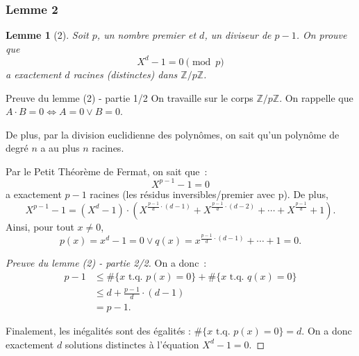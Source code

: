 \documentclass[10pt, mathserif]{beamer}
\newcommand{\tq}{\text{ t.q. }}
\newcommand{\Z}{\mathbb Z}
\newtheorem{lem}[thm]{Lemme}
\theoremstyle{definition}
\theoremstyle{remark}
\begin{document}
	\begin{frame}
		\frametitle{Lemme 2}
		\begin{lem}[2]
			Soit $p$, un nombre premier et $d$, un diviseur de $p-1$. On prouve que
			\[X^d - 1 = 0 \pmod p\]
			a exactement $d$ racines (distinctes) dans $\Z/p\Z$.
		\end{lem}
	\end{frame}

	\begin{frame}
		\begin{block}{Preuve du lemme (2) - partie 1/2}
			On travaille sur le corps $\Z/p\Z$. On rappelle que $A \cdot B = 0\Longleftrightarrow A = 0 \lor B=0$.

			De plus, par la division euclidienne des polynômes, on sait qu'un polynôme de degré $n$ a au plus $n$ racines.

			Par le Petit Théorème de Fermat, on sait que~: \[X^{p-1}-1 = 0\] a exactement $p-1$ racines (les résidus inversibles/premier avec p). De plus,
			\[X^{p-1} - 1 = \left(X^{d}-1\right) \cdot \left(X^{\frac{p-1}{d} \cdot (d-1)} + X^{\frac{p-1}{d} \cdot (d-2)} + \dotsb + X^{\frac{p-1}{d}}+1\right).\]
			Ainsi, pour tout $x \neq 0$,
			\[p(x) = x^d-1 = 0 \lor q(x) = x^{\frac{p-1}{d} \cdot (d-1)} + \dotsb + 1 = 0.\]
		\end{block}
	\end{frame}

	\begin{frame}
		\begin{proof}[Preuve du lemme (2) - partie 2/2]
			On a donc~:
			\[\begin{aligned}
				p-1 &\leq \#\{x \tq p(x) = 0\} + \#\{x \tq q(x) = 0\} \\
				    & \leq d + \frac{p-1}{d} \cdot(d-1) \\
					&= p-1.
			\end{aligned}\]

			Finalement, les inégalités sont des égalités : $\#\{x \tq p(x) = 0\} = d$. On a donc exactement $d$ solutions distinctes à l'équation $X^d-1=0$.
		\end{proof}
	\end{frame}
\end{document}
